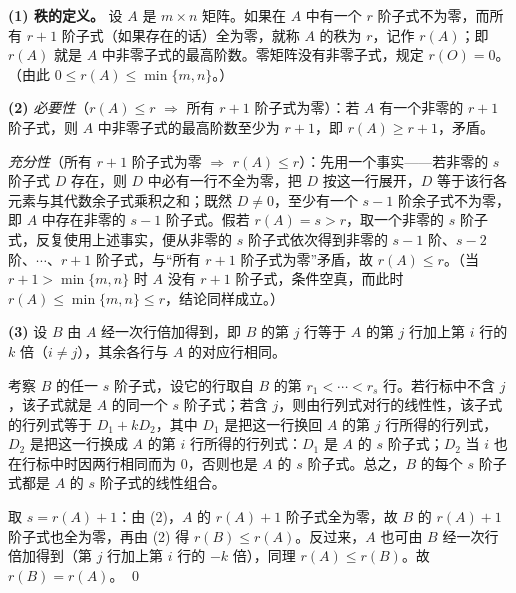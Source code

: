 \begin{solution}
\textbf{(1) 秩的定义。} 设 $A$ 是 $m\times n$ 矩阵。如果在 $A$ 中有一个 $r$ 阶子式不为零，而所有 $r+1$ 阶子式（如果存在的话）全为零，就称 $A$ 的秩为 $r$，记作 $r(A)$；即 $r(A)$ 就是 $A$ 中非零子式的最高阶数。零矩阵没有非零子式，规定 $r(O)=0$。（由此 $0\le r(A)\le\min\{m,n\}$。）

\textbf{(2)} \emph{必要性}（$r(A)\le r$ $\Rightarrow$ 所有 $r+1$ 阶子式为零）：若 $A$ 有一个非零的 $r+1$ 阶子式，则 $A$ 中非零子式的最高阶数至少为 $r+1$，即 $r(A)\ge r+1$，矛盾。

\emph{充分性}（所有 $r+1$ 阶子式为零 $\Rightarrow$ $r(A)\le r$）：先用一个事实——若非零的 $s$ 阶子式 $D$ 存在，则 $D$ 中必有一行不全为零，把 $D$ 按这一行展开，$D$ 等于该行各元素与其代数余子式乘积之和；既然 $D\ne0$，至少有一个 $s-1$ 阶余子式不为零，即 $A$ 中存在非零的 $s-1$ 阶子式。假若 $r(A)=s>r$，取一个非零的 $s$ 阶子式，反复使用上述事实，便从非零的 $s$ 阶子式依次得到非零的 $s-1$ 阶、$s-2$ 阶、$\cdots$、$r+1$ 阶子式，与“所有 $r+1$ 阶子式为零”矛盾，故 $r(A)\le r$。（当 $r+1>\min\{m,n\}$ 时 $A$ 没有 $r+1$ 阶子式，条件空真，而此时 $r(A)\le\min\{m,n\}\le r$，结论同样成立。）

\textbf{(3)} 设 $B$ 由 $A$ 经一次行倍加得到，即 $B$ 的第 $j$ 行等于 $A$ 的第 $j$ 行加上第 $i$ 行的 $k$ 倍（$i\ne j$），其余各行与 $A$ 的对应行相同。

考察 $B$ 的任一 $s$ 阶子式，设它的行取自 $B$ 的第 $r_1<\cdots<r_s$ 行。若行标中不含 $j$，该子式就是 $A$ 的同一个 $s$ 阶子式；若含 $j$，则由行列式对行的线性性，该子式的行列式等于 $D_1+kD_2$，其中 $D_1$ 是把这一行换回 $A$ 的第 $j$ 行所得的行列式，$D_2$ 是把这一行换成 $A$ 的第 $i$ 行所得的行列式：$D_1$ 是 $A$ 的 $s$ 阶子式；$D_2$ 当 $i$ 也在行标中时因两行相同而为 $0$，否则也是 $A$ 的 $s$ 阶子式。总之，$B$ 的每个 $s$ 阶子式都是 $A$ 的 $s$ 阶子式的线性组合。

取 $s=r(A)+1$：由 (2)，$A$ 的 $r(A)+1$ 阶子式全为零，故 $B$ 的 $r(A)+1$ 阶子式也全为零，再由 (2) 得 $r(B)\le r(A)$。反过来，$A$ 也可由 $B$ 经一次行倍加得到（第 $j$ 行加上第 $i$ 行的 $-k$ 倍），同理 $r(A)\le r(B)$。故 $r(B)=r(A)$。
\qed
\end{solution}

